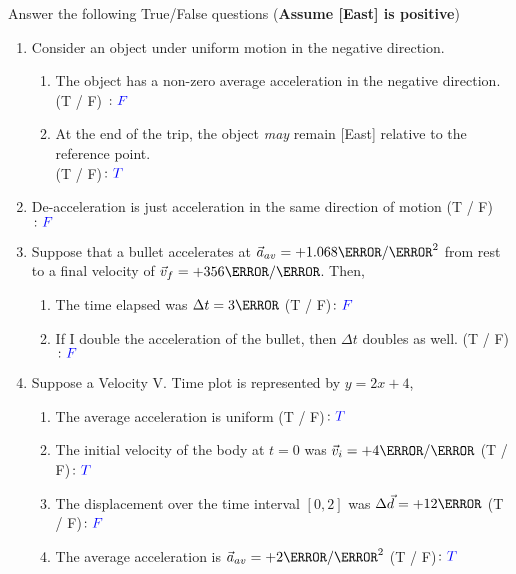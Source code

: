 \documentclass[12pt]{article} %
\begin{document}
\begin{qstn}[1] %
    Answer the following True/False questions (\textbf{Assume [East] is positive})
    \begin{enumerate}
        \item Consider an object under uniform motion in the negative direction.
            \begin{enumerate}[label = (\alph*)]
                \item The object has a non-zero average acceleration in the negative direction. (T / F) $\colon \textcolor{blue}{F}$
                \item At the end of the trip, the object \emph{may} remain [East] relative to the reference point. \\(T / F)$\colon \textcolor{blue}{T}$
            \end{enumerate}
        \item De-acceleration is just acceleration in the same direction of motion (T / F) $\colon \textcolor{blue}{F}$
        \item Suppose that a bullet accelerates at $\vec a_{av} = +1.068 \km / \s^2$ from rest to a final velocity of $\vec v_f = +356 \m / \s$. Then,
            \begin{enumerate}[label = (\alph*)]
                \item The time elapsed was $\Delta t = 3\s$ (T / F)$\colon \textcolor{blue}{F}$
                \item If I double the acceleration of the bullet, then $\Delta t$ doubles as well. (T / F)$\colon \textcolor{blue}{F}$
            \end{enumerate}
        \item Suppose a Velocity V. Time plot is represented by $y = 2x + 4$,
            \begin{enumerate}[label = (\alph*)]
                \item The average acceleration is uniform (T / F)$\colon \textcolor{blue}{T}$
                \item The initial velocity of the body at $t = 0$ was $\vec v_i = +4 \m / \s$ (T / F)$\colon \textcolor{blue}{T}$
                \item The displacement over the time interval $[0,2]$ was $\Delta \vec d = +12\m$ (T / F)$\colon \textcolor{blue}{F}$
                \item The average acceleration is $\vec a_{av} = +2\m / \s^2$ (T / F)$\colon \textcolor{blue}{T}$
            \end{enumerate}

\end{enumerate}
\end{qstn}
\end{document}
